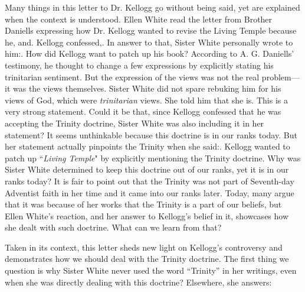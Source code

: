 Many things in this letter to Dr. Kellogg go without being said, yet are explained when the context is understood. Ellen White read the letter from Brother Daniells expressing how Dr. Kellogg wanted to revise the Living Temple because he, and. Kellogg confessed,. In answer to that, Sister White personally wrote to him:. How did Kellogg want to patch up his book? According to A. G. Daniells’ testimony, he thought to change a few expressions by explicitly stating his trinitarian sentiment. But the expression of the views was not the real problem—it was the views themselves. Sister White did not spare rebuking him for his views of God, which were \textit{trinitarian} views. She told him that she is. This is a very strong statement. Could it be that, since Kellogg confessed that he was accepting the Trinity doctrine, Sister White was also including it in her statement? It seems unthinkable because this doctrine is in our ranks today. But her statement actually pinpoints the Trinity when she said:. Kellogg wanted to patch up “\textit{Living Temple}" by explicitly mentioning the Trinity doctrine. Why was Sister White determined to keep this doctrine out of our ranks, yet it is in our ranks today? It is fair to point out that the Trinity was not part of Seventh-day Adventist faith in her time and it came into our ranks later. Today, many argue that it was because of her works that the Trinity is a part of our beliefs, but Ellen White’s reaction, and her answer to Kellogg’s belief in it, showcases how she dealt with such doctrine. What can we learn from that?

Taken in its context, this letter sheds new light on Kellogg’s controversy and demonstrates how we should deal with the Trinity doctrine. The first thing we question is why Sister White never used the word “Trinity” in her writings, even when she was directly dealing with this doctrine? Elsewhere, she answers: 

